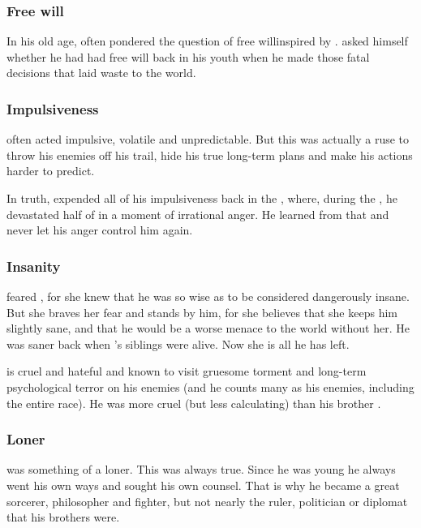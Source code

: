 \subsubsection{Free will}
In his old age, \Iscrafel often pondered the question of free will\dash inspired by .
\Iscrafel asked himself whether he had had free will back in his youth when he made those fatal decisions that laid waste to the world. 





\subsubsection{Impulsiveness}
\Ishnaruchaefir{} often acted impulsive, volatile and unpredictable. 
But this was actually a ruse to throw his enemies off his trail, hide his true long-term plans and make his actions harder to predict. 

In truth, \Ishnaruchaefir{} expended all of his impulsiveness back in the \secondbanewar, where, during the \SecondShrouding, he devastated half of \Miith{} in a moment of irrational anger. 
He learned from that and never let his anger control him again.





\subsubsection{Insanity}
\Criseis feared \Iscrafel, for she knew that he was \dash so wise as to be considered dangerously insane.
But she braves her fear and stands by him, for she believes that she keeps him slightly sane, and that he would be a worse menace to the world without her. 
He was saner back when \Criseis’s siblings were alive. 
Now she is all he has left. 

\Iscrafel is cruel and hateful and known to visit gruesome torment and long-term psychological terror on his enemies (and he counts many as his enemies, including the entire \resphan race). 
He was more cruel (but less calculating) than his brother \Secherdamon. 






\subsubsection{Loner}
\Ishnaruchaefir{} was something of a loner. 
This was always true. 
Since he was young he always went his own ways and sought his own counsel. 
That is why he became a great sorcerer, philosopher and fighter, but not nearly the ruler, politician or diplomat that his brothers were. 

